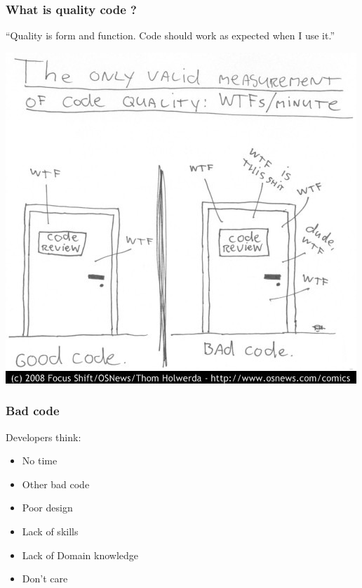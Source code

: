 
\begin{frame}
  \frametitle{What is quality code ?}

\begin{exampleblock}{}
  {\large ``Quality is form and function. Code should work as expected when I use it.''}
\end{exampleblock}
\end{frame}

\begin{frame}
   \begin{center}
   \includegraphics[width=\textwidth,height=0.8\textheight,keepaspectratio]{wtfm.jpg}
   \end{center}
\end{frame}

\begin{frame}
  \frametitle{Bad code}
  Developers think:
  \begin{itemize}
  \item No time\pause
  \item Other bad code\pause
  \item Poor design\pause
  \item Lack of skills\pause
  \item Lack of Domain knowledge\pause
  \item Don't care\pause
  \end{itemize}
\end{frame}

